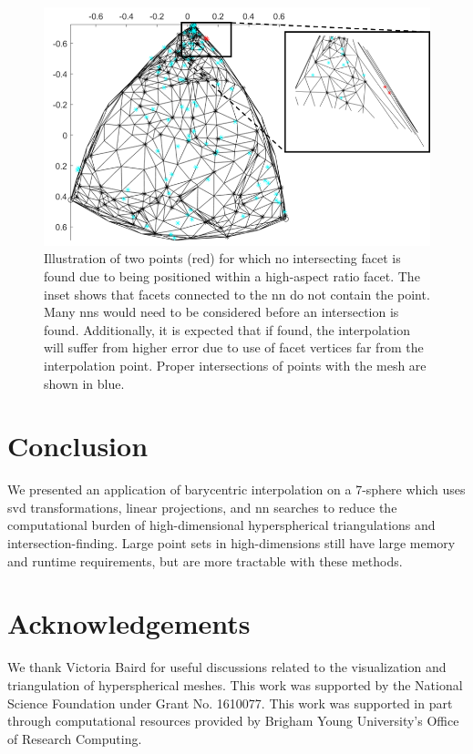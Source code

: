 \documentclass[final,12pt]{elsarticle}
\begin{document}
\begin{figure}
	\centering
	\includegraphics[scale=0.8]{figures/high-aspect-non-int.png}
	\caption{Illustration of two \outpt{} points (red) for which no intersecting facet is found due to being positioned within a high-aspect ratio facet. The inset shows that facets connected to the \gls{nn} do not contain the \outpt{} point. Many \glspl{nn} would need to be considered before an intersection is found. Additionally, it is expected that if found, the interpolation will suffer from higher error due to use of facet vertices far from the interpolation point. Proper intersections of \outpt{} points with the mesh are shown in blue.}
	\label{fig:high-aspect-non-int}
\end{figure}

\section{Conclusion}
We presented an application of barycentric interpolation on a 7-sphere which uses \gls{svd} transformations, linear projections, and \gls{nn} searches to reduce the computational burden of high-dimensional hyperspherical triangulations and intersection-finding. Large point sets in high-dimensions still have large memory and runtime requirements, but are more tractable with these methods.

\section*{Acknowledgements}
We thank Victoria Baird for useful discussions related to the visualization and triangulation of hyperspherical meshes. This work was supported by the National Science Foundation under Grant No. 1610077. This work was supported in part through computational resources provided by Brigham Young University's Office of Research Computing.

\printglossaries



\end{document}
